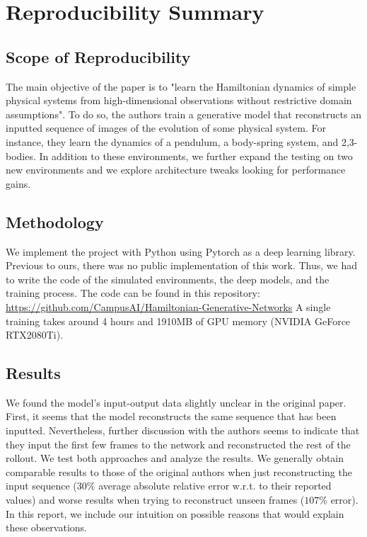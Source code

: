 \section*{\centering Reproducibility Summary}

\subsection*{Scope of Reproducibility}
The main objective of the paper is to "learn the Hamiltonian dynamics of simple physical systems from high-dimensional observations without restrictive domain assumptions".
To do so, the authors train a generative model that reconstructs an inputted sequence of images of the evolution of some physical system.
For instance, they learn the dynamics of a pendulum, a body-spring system, and 2,3-bodies.
In addition to these environments, we further expand the testing on two new environments and we explore architecture tweaks looking for performance gains.

\subsection*{Methodology}
We implement the project with Python using Pytorch \cite{pytorch} as a deep learning library.
Previous to ours, there was no public implementation of this work.
Thus, we had to write the code of the simulated environments, the deep models, and the training process.
The code can be found in this repository: \href{https://github.com/CampusAI/Hamiltonian-Generative-Networks}{https://github.com/CampusAI/Hamiltonian-Generative-Networks}
A single training takes around 4 hours and 1910MB of GPU memory (NVIDIA GeForce RTX2080Ti).


\subsection*{Results}
We found the model's input-output data slightly unclear in the original paper.
First, it seems that the model reconstructs the same sequence that has been inputted.
Nevertheless, further discussion with the authors seems to indicate that they input the first few frames to the network and reconstructed the rest of the rollout.
We test both approaches and analyze the results.
We generally obtain comparable results to those of the original authors when just reconstructing the input sequence ($30\%$ average absolute relative error w.r.t. to their reported values) and worse results when trying to reconstruct unseen frames ($107\%$ error).
In this report, we include our intuition on possible reasons that would explain these observations.


